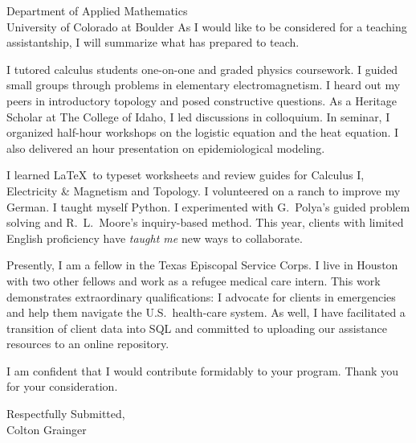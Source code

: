 \documentclass[10pt]{letter}
\newcommand{\term}[1]{\textmd{#1}}
\begin{document}
\begin{letter}{Department of Applied Mathematics\\University of Colorado at Boulder}
As I would like to be considered for a teaching assistantship, I will summarize what has prepared to teach. 

\begin{description}[topsep=0pt]
	\item[Tutoring \& Grading] I \term{tutored calculus students} one-on-one and \term{graded physics coursework}. I guided small groups through problems in elementary electromagnetism. I heard out my peers in introductory topology and posed constructive questions. As a Heritage Scholar at The College of Idaho, I led discussions in colloquium. In seminar, I organized half-hour workshops on the logistic equation and the heat equation. I also delivered an hour presentation on \term{epidemiological modeling}. 
	\item[Trying Something Different] I learned \LaTeX\ to typeset worksheets and review guides for Calculus I, Electricity \& Magnetism and Topology. I volunteered on a ranch to improve my \term{German}. I taught myself \term{Python}. I experimented with G.~Polya's guided problem solving and R.~L.~Moore's inquiry-based method. This year, clients with limited English proficiency have \emph{taught me} new ways to collaborate. 
\end{description}

Presently, I am a fellow in the Texas Episcopal Service Corps. I live in Houston with two other fellows and work as a refugee medical care intern. This work demonstrates extraordinary qualifications: I advocate for clients in emergencies and help them navigate the U.S.\ health-care system. As well, I have facilitated a transition of client data into SQL and committed to uploading our assistance resources to an online repository.

I am confident that I would contribute formidably to your program. Thank you for your consideration.

\closing{Respectfully Submitted,\\Colton Grainger}
\end{letter}
\end{document}
